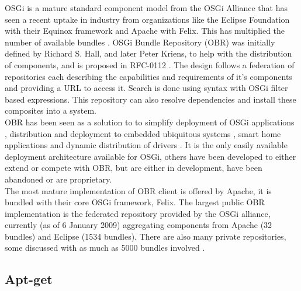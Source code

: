 OSGi is a 
mature standard component model from the OSGi Alliance that has seen a recent uptake in industry \cite{kriens_osgi_2008} 
from organizations like the Eclipse Foundation with their Equinox framework and Apache with Felix. This has multiplied the 
number of available bundles \cite{the_osgi_alliance_rfc-0112_2006}. OSGi Bundle Repository (OBR) was initially defined by 
Richard S. Hall, and later Peter Kriens, to help with the distribution of components, and is proposed in 
RFC-0112 \cite{the_osgi_alliance_rfc-0112_2006}. The design follows a federation of repositories each describing 
the capabilities and requirements of it's components and providing a URL to access it. Search is done using syntax with OSGi filter 
based expressions. This repository can also resolve dependencies and install these composites into a system. \\
OBR has been seen as a solution to to simplify deployment of OSGi applications
\cite{jung_integrating_2007}, distribution and deployment to embedded
ubiquitous systems \cite{jung_embedded_2006}, smart home applications \cite{gouin-vallerand_managing_2007} and 
dynamic distribution of drivers \cite{kriens_osgi_2008}. It is the only easily available deployment 
architecture available for OSGi, others have been developed to either extend or compete \cite{frnot_component_2005} with OBR, 
but are either in development, have been abandoned or are proprietary.\\ 
The most mature implementation of OBR client is offered by Apache, it is bundled with their core OSGi framework, Felix. 
The largest public OBR implementation is the federated repository provided by the OSGi alliance,
currently (as of 6 January 2009) aggregating components from Apache (32 bundles) and Eclipse (1534 bundles).
There are also many private repositories, some discussed with as much as 5000 bundles involved \cite{kriens_osgi_2008}.\\  

\subsection{Apt-get}

